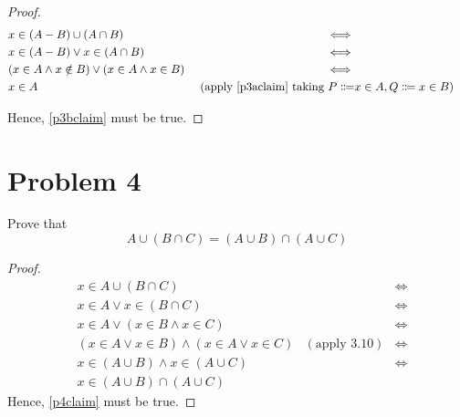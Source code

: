 \documentclass{article}
\begin{document}
\begin{proof}
	\begin{align*}
		 & x \in (A - B) \cup (A \cap B)                           & \iff                                                                                         \\
		 & x \in (A - B) \lor x \in (A \cap B)                     & \iff                                                                                         \\
		 & (x \in A \land x \notin B) \lor (x \in A \land x \in B) & \iff                                                                                         \\
		 & x \in A                                                 & \text{ (apply } \eqref{p3aclaim} \text{ taking } P \Coloneqq & x \in A, Q \Coloneqq x \in B) \\
	\end{align*}

	Hence, \eqref{p3bclaim} must be true.
\end{proof}

\pagebreak

\section{Problem 4}
Prove that
\begin{equation}\label{p4claim}
	A \cup (B \cap C) = (A \cup B) \cap (A \cup C)
\end{equation}
\begin{proof}
	\begin{align*}
		 & x \in A \cup (B \cap C)                             &                     & \iff \\
		 & x \in A \lor x \in (B \cap C)                       &                     & \iff \\
		 & x \in A \lor (x \in B \land x \in C)                &                     & \iff \\
		 & (x \in A \lor x \in B) \land (x \in A \lor x \in C) & (\text{apply 3.10}) & \iff \\
		 & x \in (A \cup B) \land x \in (A \cup C)             &                     & \iff \\
		 & x \in (A \cup B) \cap (A \cup C)
	\end{align*}
	Hence, \eqref{p4claim} must be true.
\end{proof}

\pagebreak
\end{document}
